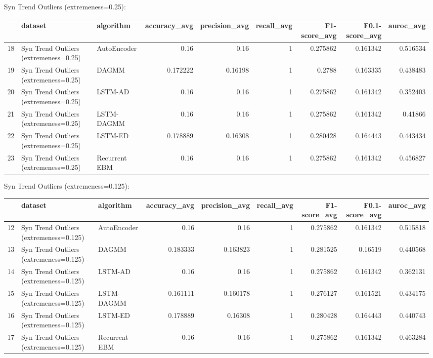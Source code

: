 Syn Trend Outliers (extremeness=0.25):

\begin{tabular}{rllrrrrrr}
\hline
    & dataset                               & algorithm     &   accuracy\_avg &   precision\_avg &   recall\_avg &   F1-score\_avg &   F0.1-score\_avg &   auroc\_avg \\
\hline
 18 & Syn Trend Outliers (extremeness=0.25) & AutoEncoder   &       0.16     &         0.16    &            1 &       0.275862 &         0.161342 &    0.516534 \\
 19 & Syn Trend Outliers (extremeness=0.25) & DAGMM         &       0.172222 &         0.16198 &            1 &       0.2788   &         0.163335 &    0.438483 \\
 20 & Syn Trend Outliers (extremeness=0.25) & LSTM-AD       &       0.16     &         0.16    &            1 &       0.275862 &         0.161342 &    0.352403 \\
 21 & Syn Trend Outliers (extremeness=0.25) & LSTM-DAGMM    &       0.16     &         0.16    &            1 &       0.275862 &         0.161342 &    0.41866  \\
 22 & Syn Trend Outliers (extremeness=0.25) & LSTM-ED       &       0.178889 &         0.16308 &            1 &       0.280428 &         0.164443 &    0.443434 \\
 23 & Syn Trend Outliers (extremeness=0.25) & Recurrent EBM &       0.16     &         0.16    &            1 &       0.275862 &         0.161342 &    0.456827 \\
\hline
\end{tabular}

Syn Trend Outliers (extremeness=0.125):

\begin{tabular}{rllrrrrrr}
\hline
    & dataset                                & algorithm     &   accuracy\_avg &   precision\_avg &   recall\_avg &   F1-score\_avg &   F0.1-score\_avg &   auroc\_avg \\
\hline
 12 & Syn Trend Outliers (extremeness=0.125) & AutoEncoder   &       0.16     &        0.16     &            1 &       0.275862 &         0.161342 &    0.515818 \\
 13 & Syn Trend Outliers (extremeness=0.125) & DAGMM         &       0.183333 &        0.163823 &            1 &       0.281525 &         0.16519  &    0.440568 \\
 14 & Syn Trend Outliers (extremeness=0.125) & LSTM-AD       &       0.16     &        0.16     &            1 &       0.275862 &         0.161342 &    0.362131 \\
 15 & Syn Trend Outliers (extremeness=0.125) & LSTM-DAGMM    &       0.161111 &        0.160178 &            1 &       0.276127 &         0.161521 &    0.434175 \\
 16 & Syn Trend Outliers (extremeness=0.125) & LSTM-ED       &       0.178889 &        0.16308  &            1 &       0.280428 &         0.164443 &    0.440743 \\
 17 & Syn Trend Outliers (extremeness=0.125) & Recurrent EBM &       0.16     &        0.16     &            1 &       0.275862 &         0.161342 &    0.463284 \\
\hline
\end{tabular}

